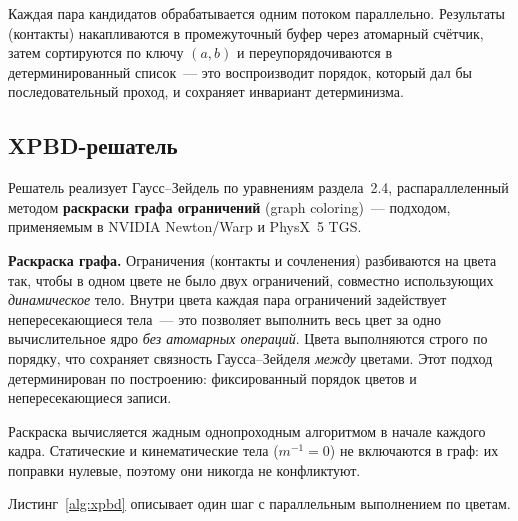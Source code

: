 Каждая пара кандидатов обрабатывается одним потоком параллельно. Результаты (контакты) накапливаются в 
промежуточный буфер через атомарный счётчик, затем сортируются по ключу $(a, b)$ и переупорядочиваются в 
детерминированный список~--- это воспроизводит порядок, который дал бы последовательный проход, и сохраняет 
инвариант детерминизма.

\subsection{XPBD-решатель}
\label{sec:xpbd_impl}

Решатель реализует Гаусс--Зейдель по уравнениям раздела~2.4, распараллеленный методом \textbf{раскраски графа 
ограничений} (graph coloring)~--- подходом, применяемым в NVIDIA Newton/Warp и PhysX~5 TGS.

\textbf{Раскраска графа.} Ограничения (контакты и сочленения) разбиваются на цвета так, чтобы в одном цвете не 
было двух ограничений, совместно использующих \emph{динамическое} тело. Внутри цвета каждая пара ограничений 
задействует непересекающиеся тела~--- это позволяет выполнить весь цвет за одно вычислительное ядро \emph{без атомарных 
операций}. Цвета выполняются строго по порядку, что сохраняет связность Гаусса--Зейделя \emph{между} цветами. 
Этот подход детерминирован по построению: фиксированный порядок цветов и непересекающиеся записи.

Раскраска вычисляется жадным однопроходным алгоритмом в начале каждого кадра. Статические и кинематические 
тела ($m^{-1} = 0$) не включаются в граф: их поправки нулевые, поэтому они никогда не конфликтуют.

Листинг~\ref{alg:xpbd} описывает один шаг с параллельным выполнением по цветам.

